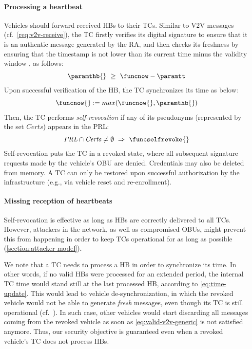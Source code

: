 \paragraph{Processing a heartbeat}
\label{section:design-processing-hb}
%
Vehicles should forward received \acp{HB} to their \acp{TC}. Similar to \ac{V2V}
messages (cf.~\cref{req:v2v-receive}), the \ac{TC} firstly verifies its digital
signature to ensure that it is an authentic message generated by the \ac{RA},
and then checks its freshness by ensuring that the timestamp \paramthb{} is not
lower than its current time \funcnow{} minus the validity window \paramtt, as
follows:
%
\begin{equation}
    \label{eq:valid-heartbeat}
    \paramthb{} \ \geq\  \funcnow - \paramtt
\end{equation}
%
Upon successful verification of the \ac{HB}, the \ac{TC} synchronizes its time
as below:
%
\begin{equation}
    \label{eq:time-update}
    \funcnow{} := max(\funcnow{}, \paramthb{})
\end{equation}
%
Then, the \ac{TC} performs \emph{self-revocation} if any of its pseudonyms
(represented by the set $\mathit{Certs}$) appears in the \ac{PRL}:
%
\begin{equation}
    \label{eq:self-rev}
    \mathit{PRL} \cap \mathit{Certs} \neq \emptyset \ \Rightarrow\  \funcselfrevoke{}
\end{equation}
%
Self-revocation puts the \ac{TC} in a revoked state, where all subsequent
signature requests made by the vehicle's \ac{OBU} are denied. Credentials may
also be deleted from memory. A \ac{TC} can only be restored upon successful
authorization by the infrastructure (e.g., via vehicle reset and re-enrollment).

\paragraph{Missing reception of heartbeats}
%
Self-revocation is effective as long as \acp{HB} are correctly delivered to all
\acp{TC}. However, attackers in the network, as well as compromised \acp{OBU},
might prevent this from happening in order to keep \acp{TC} operational for as
long as possible (\cref{section:attacker-model}).

We note that a \ac{TC} needs to process a \ac{HB} in order to synchronize its
time. In other words, if no valid \acp{HB} were processed for an extended
period, the internal \ac{TC} time \funcnow{} would stand still at the last
processed \ac{HB}, according to \cref{eq:time-update}. This would lead to
vehicle de-synchronization, in which the revoked vehicle would not be able to
generate \emph{fresh} messages, even though its \ac{TC} is still operational
(cf.~). In such case, other vehicles would start discarding
all messages coming from the revoked vehicle as soon as
\cref{eq:valid-v2v-generic} is not satisfied anymore. Thus, our security
objective is guaranteed even when a revoked vehicle's \ac{TC} does not process
\acp{HB}.

